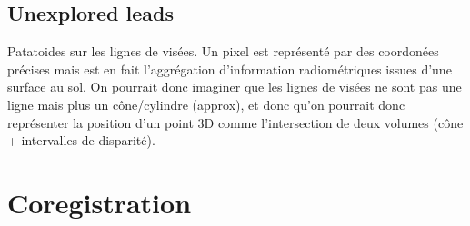 \subsection{Unexplored leads}
Patatoides sur les lignes de visées. Un pixel est représenté par des coordonées précises mais est en fait l'aggrégation d'information radiométriques issues d'une surface au sol. On pourrait donc imaginer que les lignes de visées ne sont pas une ligne mais plus un cône/cylindre (approx), et donc qu'on pourrait donc représenter la position d'un point 3D comme l'intersection de deux volumes (cône + intervalles de disparité).   

\section{Coregistration}

\pagebreak
\blankpage